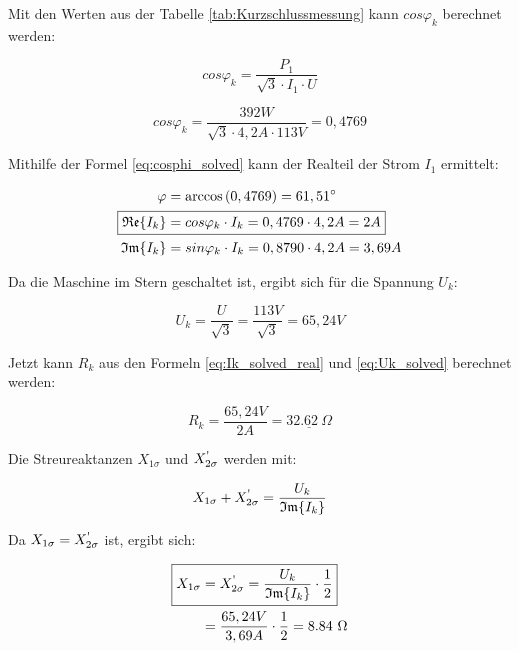 \documentclass[conference]{IEEEtran}
\begin{document}
Mit den Werten aus der Tabelle \ref{tab:Kurzschlussmessung} kann $cos\varphi_k$ berechnet werden:

\begin{equation}
    \boxed{cos\varphi_k = \frac{P_1}{\sqrt{3} \cdot I_1 \cdot U}}
\end{equation}

\begin{equation} \label{eq:cosphi_solved}
    cos\varphi_k = \frac{392 W}{\sqrt{3} \cdot 4,2 A \cdot 113 V} = 0,4769
\end{equation}

Mithilfe der Formel \ref{eq:cosphi_solved} kann der Realteil der Strom $I_1$ ermittelt:

\begin{align} \label{eq:Ik_solved_real}
    \varphi                      & = \arccos\left(0,4769\right) = 61,51^\circ             \\
    \Aboxed{\mathfrak{Re}\{I_k\} & = cos\varphi_k \cdot I_k = 0,4769 \cdot 4,2 A = 2A}    \\
    \mathfrak{Im}\{I_k\}         & = sin\varphi_k \cdot I_k = 0,8790 \cdot 4,2 A = 3,69 A
\end{align}

Da die Maschine im Stern geschaltet ist, ergibt sich für die Spannung $U_k$:

\begin{equation} \label{eq:Uk_solved}
    \boxed{U_k = \frac{U}{\sqrt{3}}} = \frac{113 V}{\sqrt{3}} = 65,24 V
\end{equation}

Jetzt kann $R_k$ aus den Formeln \ref{eq:Ik_solved_real} und \ref{eq:Uk_solved} berechnet werden:

\begin{equation} \label{eq:Kurzschlusswiderstand_calc}
    \boxed{R_k = \frac{65,24V}{2A} = \underline{32.62\ \Omega}}
\end{equation}

Die Streureaktanzen $X_{1\sigma}$ und $X_{2\sigma}^\text{\textquotesingle}$ werden mit:

\begin{equation} \label{eq:Streureaktanzen}
    X_{1\sigma} + X_{2\sigma}^\text{\textquotesingle} = \frac{U_k}{\mathfrak{Im}\{I_k\}}
\end{equation}

Da $X_{1\sigma} = X_{2\sigma}^\text{\textquotesingle}$ ist, ergibt sich:

\begin{align} \label{eq:Streureaktanzen_solved}
    \Aboxed{X_{1\sigma} & = X_{2\sigma}^\text{\textquotesingle} = \frac{U_k}{\mathfrak{Im}\{I_k\}}\cdot\frac{1}{2}} \\
                        & = \frac{65,24V}{3,69A}\cdot\frac{1}{2} = 8.84\ \Omega
\end{align}
\end{document}
